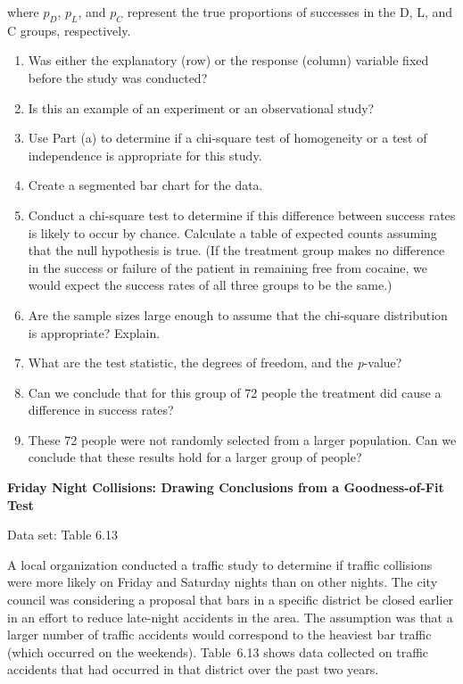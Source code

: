 \documentclass[
]{report}
\begin{document}
\begin{list}{E.}{ \setlength{\itemsep}{0.5em}}
  where $p_D$, $p_L$, and $p_C$ represent the true proportions of successes in the D, L, and C groups,
respectively.
  \begin{enumerate}
    \item Was either the explanatory (row) or the response (column) variable fixed before the study was conducted?
    \item Is this an example of an experiment or an observational study?
    \item Use Part (a) to determine if a chi-square test of homogeneity or a test of independence is appropriate for this study.
    \item Create a segmented bar chart for the data.
    \item Conduct a chi-square test to determine if this difference between success rates is likely to occur by chance. Calculate a table of expected counts assuming that the null hypothesis is true. (If the
treatment group makes no difference in the success or failure of the patient in remaining free
from cocaine, we would expect the success rates of all three groups to be the same.)
    \item Are the sample sizes large enough to assume that the chi-square distribution is appropriate? Explain.
    \item What are the test statistic, the degrees of freedom, and the \textit{p}-value?
    \item Can we conclude that for this group of 72 people the treatment did cause a difference in success rates?
    \item These 72 people were not randomly selected from a larger population. Can we conclude that these results hold for a larger group of people?
  \end{enumerate}

  \item \textbf{Friday Night Collisions: Drawing Conclusions from a Goodness-of-Fit Test}    

  Data set: Table 6.13    
  
  A local organization conducted a traffic study to determine if traffic collisions were more likely on Friday and Saturday nights than on other nights. The city council was considering a proposal that bars in a specific district be closed earlier in an effort to reduce late-night accidents in the area. The assumption was that a larger number of traffic accidents would correspond to the heaviest bar traffic (which occurred on the weekends). Table 6.13 shows data collected on traffic accidents that had occurred in that district over the past two years.  
  

\end{list}
\end{document}
